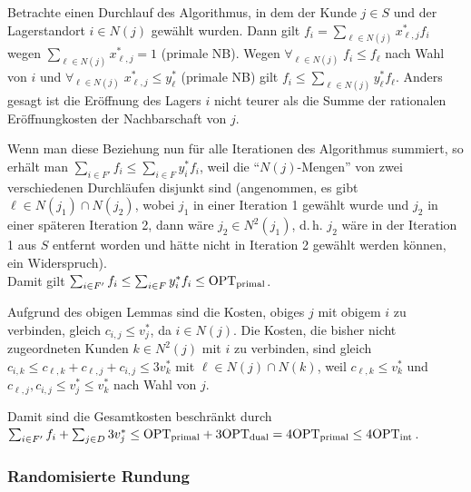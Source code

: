 \begin{Beweis}
    Betrachte einen Durchlauf des Algorithmus, in dem der Kunde $j \in S$ und
    der Lagerstandort $i \in N(j)$ gewählt wurden.
    Dann gilt
    $f_i = \sum_{\ell \in N(j)} x_{\ell,j}^\ast f_i$ wegen
    $\sum_{\ell \in N(j)} x_{\ell,j}^\ast = 1$ (primale NB).
    Wegen $\forall_{\ell \in N(j)}\; f_i \le f_\ell$ nach Wahl von $i$ und
    $\forall_{\ell \in N(j)}\; x_{\ell,j}^\ast \le y_\ell^\ast$ (primale NB) gilt
    $f_i \le \sum_{\ell \in N(j)} y_\ell^\ast f_\ell$.
    Anders gesagt ist die Eröffnung des Lagers $i$ nicht teurer als die
    Summe der rationalen Eröffnungkosten der Nachbarschaft von $j$.
    
    Wenn man diese Beziehung nun für alle Iterationen des Algorithmus summiert,
    so erhält man $\sum_{i \in F'} f_i \le \sum_{i \in F} y_i^\ast f_i$,
    weil die "`$N(j)$-Mengen"' von zwei verschiedenen Durchläufen disjunkt sind
    (angenommen, es gibt $\ell \in N(j_1) \cap N(j_2)$,
    wobei $j_1$ in einer Iteration 1 gewählt wurde und $j_2$ in einer späteren Iteration 2,
    dann wäre $j_2 \in N^2(j_1)$, d.\,h. $j_2$ wäre in der Iteration 1 aus $S$ entfernt worden
    und hätte nicht in Iteration 2 gewählt werden können, ein Widerspruch).\\
    Damit gilt $\sum_{i \in F'} f_i \le \sum_{i \in F} y_i^\ast f_i \le \text{OPT}_\text{primal}$.
    
    Aufgrund des obigen Lemmas sind die Kosten, obiges $j$ mit obigem $i$ zu verbinden,
    gleich $c_{i,j} \le v_j^\ast$, da $i \in N(j)$.
    Die Kosten, die bisher nicht zugeordneten Kunden $k \in N^2(j)$ mit $i$ zu verbinden,
    sind gleich $c_{i,k} \le c_{\ell,k} + c_{\ell,j} + c_{i,j} \le 3v_k^\ast$
    mit $\ell \in N(j) \cap N(k)$, weil $c_{\ell,k} \le v_k^\ast$ und
    $c_{\ell,j}, c_{i,j} \le v_j^\ast \le v_k^\ast$ nach Wahl von $j$.
    
    Damit sind die Gesamtkosten beschränkt durch\\
    $\sum_{i \in F'} f_i + \sum_{j \in D} 3v_j^\ast
    \le \text{OPT}_\text{primal} + 3\text{OPT}_\text{dual} = 4\text{OPT}_\text{primal} \le 4\text{OPT}_\text{int}$.
\end{Beweis}

\pagebreak

\subsubsection{%
    Randomisierte Rundung%
}

